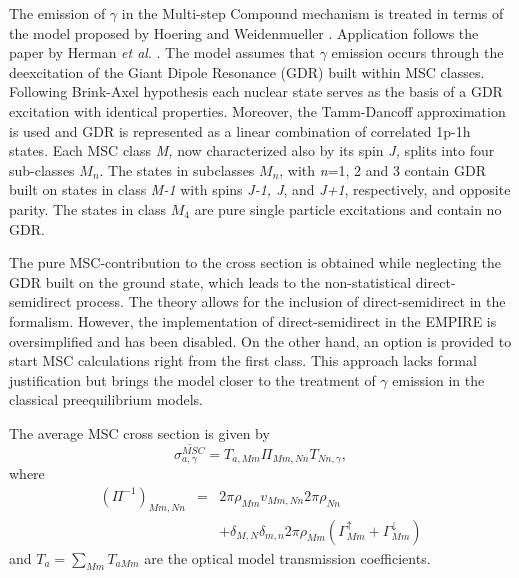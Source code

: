 \documentclass[twocolumn,amsmath,amssymb,10pt,groupedaddress,a4paper]{revtex4}
\begin{document}
The emission of $\gamma$ in the Multi-step Compound mechanism
is treated in terms of the model proposed by Hoering and Weidenmueller
\cite{GammaMSC}. Application follows the paper by Herman \emph{et
al}. \cite{GammaMSCapp}. The model assumes that $\gamma$ emission
occurs through the deexcitation of the Giant Dipole Resonance (GDR)
built within MSC classes. Following Brink-Axel hypothesis
\cite{Axel,Brink,Brinka} each nuclear state serves as the basis of
a GDR excitation with identical properties. Moreover, the Tamm-Dancoff
approximation is used and GDR is represented as a linear combination
of correlated 1p-1h states. Each MSC class \emph{M,} now characterized
also by its spin \emph{J,} splits into four sub-classes $M_{n}$.
The states in subclasses $M_{n}$, with \emph{n}=1, 2 and 3 contain
GDR built on states in class \emph{M-1} with spins \emph{J-1, J},
and \emph{J+1}, respectively, and opposite parity. The states in class
$M_{4}$ are pure single particle excitations and contain no GDR.

The pure MSC-contribution to the cross section is obtained while neglecting
the GDR built on the ground state, which leads to the non-statistical
direct-semidirect process. The theory \cite{GammaMSC} allows for
the inclusion of direct-semidirect in the formalism. However, the
implementation of direct-semidirect in the EMPIRE is oversimplified
and has been disabled. On the other hand, an option is provided to
start MSC calculations right from the first class. This
approach lacks formal justification but brings the model closer to
the treatment of $\gamma$ emission in the classical preequilibrium
models.

The average MSC cross section is given by \begin{equation}
\overline{\sigma_{a,\gamma}^{MSC}}=T_{a,Mm}\Pi_{Mm,Nn}T_{Nn,\gamma},\label{GammaMSCxs}\end{equation}
where \begin{eqnarray}
(\Pi^{-1})_{Mm,Nn} & = & 2\pi\rho_{Mm}v_{Mm,Nn}2\pi\rho_{Nn}\nonumber \\
 &  & +\delta_{M,N}\delta_{m,n}2\pi\rho_{Mm}(\Gamma_{Mm}^{\uparrow}+\Gamma_{Mm}^{\downarrow})\label{Pigamma}\end{eqnarray}
and $T_{a}=\sum_{Mm}T_{aMm}$ are the optical model transmission coefficients.
\end{document}
